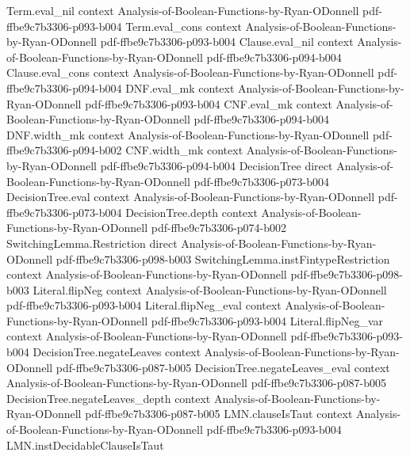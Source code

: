 \begin{lemma}
  {Term.eval_nil}
  {context}
  {Analysis-of-Boolean-Functions-by-Ryan-ODonnell}
  {pdf-ffbe9c7b3306-p093-b004}
\proofstep
  {Term.eval_cons}
  {context}
  {Analysis-of-Boolean-Functions-by-Ryan-ODonnell}
  {pdf-ffbe9c7b3306-p093-b004}
\proofstep
  {Clause.eval_nil}
  {context}
  {Analysis-of-Boolean-Functions-by-Ryan-ODonnell}
  {pdf-ffbe9c7b3306-p094-b004}
\proofstep
  {Clause.eval_cons}
  {context}
  {Analysis-of-Boolean-Functions-by-Ryan-ODonnell}
  {pdf-ffbe9c7b3306-p094-b004}
\proofstep
  {DNF.eval_mk}
  {context}
  {Analysis-of-Boolean-Functions-by-Ryan-ODonnell}
  {pdf-ffbe9c7b3306-p093-b004}
\proofstep
  {CNF.eval_mk}
  {context}
  {Analysis-of-Boolean-Functions-by-Ryan-ODonnell}
  {pdf-ffbe9c7b3306-p094-b004}
\proofstep
  {DNF.width_mk}
  {context}
  {Analysis-of-Boolean-Functions-by-Ryan-ODonnell}
  {pdf-ffbe9c7b3306-p094-b002}
\proofstep
  {CNF.width_mk}
  {context}
  {Analysis-of-Boolean-Functions-by-Ryan-ODonnell}
  {pdf-ffbe9c7b3306-p094-b004}
\proofstep
  {DecisionTree}
  {direct}
  {Analysis-of-Boolean-Functions-by-Ryan-ODonnell}
  {pdf-ffbe9c7b3306-p073-b004}
\proofstep
  {DecisionTree.eval}
  {context}
  {Analysis-of-Boolean-Functions-by-Ryan-ODonnell}
  {pdf-ffbe9c7b3306-p073-b004}
\proofstep
  {DecisionTree.depth}
  {context}
  {Analysis-of-Boolean-Functions-by-Ryan-ODonnell}
  {pdf-ffbe9c7b3306-p074-b002}
\proofstep
  {SwitchingLemma.Restriction}
  {direct}
  {Analysis-of-Boolean-Functions-by-Ryan-ODonnell}
  {pdf-ffbe9c7b3306-p098-b003}
\proofstep
  {SwitchingLemma.instFintypeRestriction}
  {context}
  {Analysis-of-Boolean-Functions-by-Ryan-ODonnell}
  {pdf-ffbe9c7b3306-p098-b003}
\proofstep
  {Literal.flipNeg}
  {context}
  {Analysis-of-Boolean-Functions-by-Ryan-ODonnell}
  {pdf-ffbe9c7b3306-p093-b004}
\proofstep
  {Literal.flipNeg_eval}
  {context}
  {Analysis-of-Boolean-Functions-by-Ryan-ODonnell}
  {pdf-ffbe9c7b3306-p093-b004}
\proofstep
  {Literal.flipNeg_var}
  {context}
  {Analysis-of-Boolean-Functions-by-Ryan-ODonnell}
  {pdf-ffbe9c7b3306-p093-b004}
\proofstep
  {DecisionTree.negateLeaves}
  {context}
  {Analysis-of-Boolean-Functions-by-Ryan-ODonnell}
  {pdf-ffbe9c7b3306-p087-b005}
\proofstep
  {DecisionTree.negateLeaves_eval}
  {context}
  {Analysis-of-Boolean-Functions-by-Ryan-ODonnell}
  {pdf-ffbe9c7b3306-p087-b005}
\proofstep
  {DecisionTree.negateLeaves_depth}
  {context}
  {Analysis-of-Boolean-Functions-by-Ryan-ODonnell}
  {pdf-ffbe9c7b3306-p087-b005}
\proofstep
  {LMN.clauseIsTaut}
  {context}
  {Analysis-of-Boolean-Functions-by-Ryan-ODonnell}
  {pdf-ffbe9c7b3306-p093-b004}
\proofstep
  {LMN.instDecidableClauseIsTaut}

\end{lemma}
